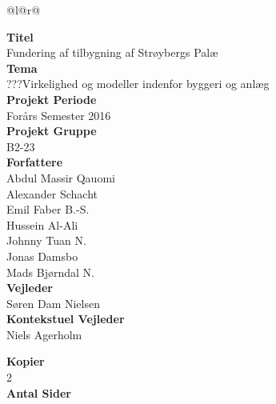 \begin{nopagebreak}
	{\begin{center}
			\begin{tabular*}{\textwidth}{@{}l@{\extracolsep{\fill}}r@{}}
				\\
				\begin{minipage}[t]{0.49\textwidth}
					\textbf{Titel}\\
					Fundering af tilbygning af Strøybergs Palæ\\

					\textbf{Tema}\\
					???Virkelighed og modeller indenfor byggeri og anlæg\\

					\textbf{Projekt Periode}\\
					Forårs Semester 2016\\

					\textbf{Projekt Gruppe}\\
					B2-23\\

					\textbf{Forfattere}\\
					Abdul Massir Qauomi\\
					Alexander Schacht\\
					Emil Faber B.-S.\\
					Hussein Al-Ali\\
					Johnny Tuan N.\\
					Jonas Damsbo\\
          Mads Bjørndal N.\\


          \textbf{Vejleder} \\
          Søren Dam Nielsen \\
          \textbf{Kontekstuel Vejleder} \\
          Niels Agerholm


					\textbf{Kopier}\\
					2\\ %

					\textbf{Antal Sider}\\
					\pageref{LastPage}\\


\end{minipage}
\end{tabular*}
\end{center}}
\end{nopagebreak}
